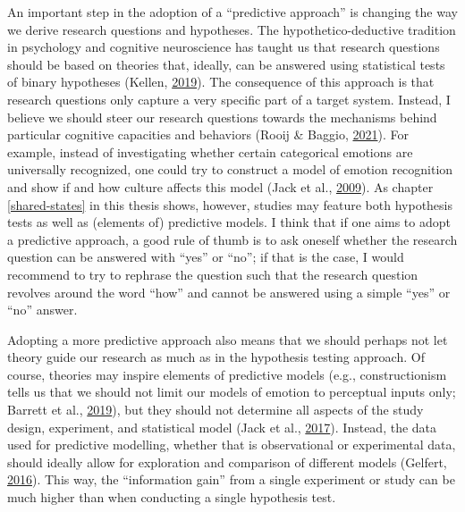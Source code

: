 \documentclass[11pt,american,a4paper,oneside,]{memoir} %
\begin{document}
An important step in the adoption of a ``predictive approach'' is changing the way we derive research questions and hypotheses. The hypothetico-deductive tradition in psychology and cognitive neuroscience has taught us that research questions should be based on theories that, ideally, can be answered using statistical tests of binary hypotheses (Kellen, \protect\hyperlink{ref-Kellen2019-af}{2019}). The consequence of this approach is that research questions only capture a very specific part of a target system. Instead, I believe we should steer our research questions towards the mechanisms behind particular cognitive capacities and behaviors (Rooij \& Baggio, \protect\hyperlink{ref-Van_Rooij2021-bk}{2021}). For example, instead of investigating whether certain categorical emotions are universally recognized, one could try to construct a model of emotion recognition and show if and how culture affects this model (Jack et al., \protect\hyperlink{ref-Jack2009-yy}{2009}). As chapter \ref{shared-states} in this thesis shows, however, studies may feature both hypothesis tests as well as (elements of) predictive models. I think that if one aims to adopt a predictive approach, a good rule of thumb is to ask oneself whether the research question can be answered with ``yes'' or ``no''; if that is the case, I would recommend to try to rephrase the question such that the research question revolves around the word ``how'' and cannot be answered using a simple ``yes'' or ``no'' answer.

Adopting a more predictive approach also means that we should perhaps not let theory guide our research as much as in the hypothesis testing approach. Of course, theories may inspire elements of predictive models (e.g., constructionism tells us that we should not limit our models of emotion to perceptual inputs only; Barrett et al., \protect\hyperlink{ref-Barrett2019-bc}{2019}), but they should not determine all aspects of the study design, experiment, and statistical model (Jack et al., \protect\hyperlink{ref-Jack2017-qp}{2017}). Instead, the data used for predictive modelling, whether that is observational or experimental data, should ideally allow for exploration and comparison of different models (Gelfert, \protect\hyperlink{ref-Gelfert2016-hd}{2016}). This way, the ``information gain'' from a single experiment or study can be much higher than when conducting a single hypothesis test.
\end{document}
